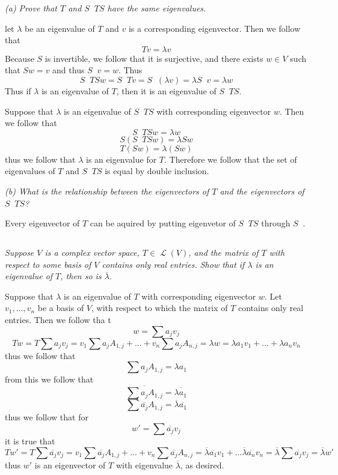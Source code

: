 \documentclass[11pt,oneside,titlepage]{book}
\DeclareMathOperator \map {\mathcal {L}}
\DeclareMathOperator \inv {^{-1}}
\begin{document}
\textit{(a) Prove that $T$ and $S \inv T S$ have the same eigenvalues.}

let $\lambda$ be an eigenvalue of $T$ and $v$ is a corresponding eigenvector. Then we follow that
$$Tv = \lambda v$$
Because $S$ is invertible, we follow that it is surjective, and
there exists $w \in V$ such that $Sw = v$ and thus $S \inv v = w$. Thus
$$S \inv T S w = S \inv T v = S \inv (\lambda v) = \lambda  S \inv v = \lambda w$$
Thus if $\lambda$ is an eigenvalue of $T$, then it is an eigenvalue of $S \inv T S$.

Suppose that $\lambda$ is an eigenvalue of $S \inv T S$ with corresponding eigenvector $w$.
Then we follow that
$$S \inv T S w = \lambda w$$
$$S (S \inv T S w) = \lambda S w$$
$$T (S w) = \lambda (S w)$$
thus we follow that $\lambda$ is an eigenvalue for $T$. Therefore we follow that the set of
eigenvalues of $T$ and $S \inv T S$ is equal by double inclusion.

\textit{(b) What is the relationship between the eigenvectors of $T$ and the eigenvectors
  of $S \inv T S$?}

Every eigenvector of $T$ can be aquired by putting eigenvetor of $S \inv T S$ through
$S \inv$.

\subsection{}

\textit{Suppose $V$ is a complex vector space, $T \in \map(V)$, and the matrix of $T$ with
  respect to some basis of $V$ contains only real entries. Show that if $\lambda$ is an eigenvalue
  of $T$, then so is $\overline{\lambda}$.}

Suppose that $\lambda$ is an eigenvalue of $T$ with corresponding eigenvector $w$. Let
$v_1, ..., v_n$ be a basis of $V$, with respect to which the matrix of $T$ contains only
real entries. Then we follow tha t
$$w = \sum{a_j v_j}$$
$$T w = T \sum{a_j v_j} = v_1 {\sum a_j A_{1, j} }  + ... + v_n {\sum a_j A_{n, j} } = \lambda w
= \lambda a_1 v_ 1 + ... + \lambda a_n v_n$$
thus we follow that
$${\sum a_j A_{1, j} } = \lambda a_1$$
from this we follow that 
$$\overline{{\sum a_j A_{1, j} }} = \overline{\lambda a_1}$$
$${\sum \overline{a_j} A_{1, j} } = \overline{\lambda} \overline{ a_1}$$
thus we follow that for
$$w' = \sum{\overline{a_j} v_j}$$
it is true that
$$Tw' = T \sum{\overline{a_j} v_j} = v_1 {\sum \overline{a_j} A_{1, j} }
+ ... + v_n {\sum \overline{a_j} A_{n, j}} = \overline{\lambda} \overline{a_1} v_1  + ...
\overline{\lambda} \overline{a_n} v_n = \overline{\lambda} \sum{\overline{a_j} v_j} =
\overline{\lambda} w' $$
thus $w'$ is an eigenvector of $T$ with eigenvalue $\overline{\lambda}$, as desired.
\end{document}
